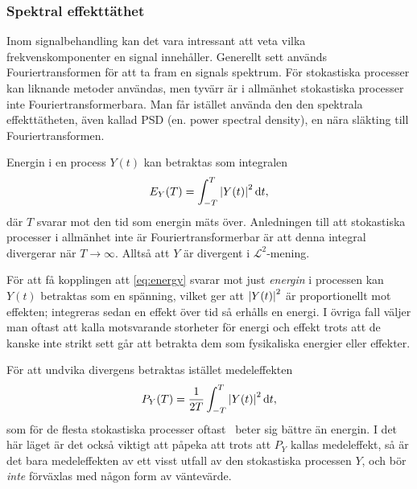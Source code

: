 \subsubsection{Spektral effekttäthet}
Inom signalbehandling kan det vara intressant att veta vilka frekvenskomponenter en signal innehåller. Generellt sett används Fouriertransformen för att ta fram en signals spektrum.
För stokastiska processer kan liknande metoder användas, men tyvärr är i allmänhet stokastiska processer inte Fouriertransformerbara. Man får istället använda den den spektrala effekttätheten, även kallad PSD (en. power spectral density), en nära släkting till Fouriertransformen.

Energin i en process $Y(t)$ kan betraktas som integralen
\begin{equation}\label{eq:energy}
E_Y(T) = \int_{-T}^{T} \abs{Y(t)}^2\,\mathrm{d}{t},
\end{equation}
där $T$ svarar mot den tid som energin mäts över. Anledningen till att stokastiska processer i allmänhet inte är Fouriertransformerbar är att denna integral divergerar när $T\to\infty$. Alltså att $Y$ är divergent i $\mathcal{L}^2$-mening. 

För att få kopplingen att \eqref{eq:energy} svarar mot just \emph{energin} i processen kan $Y(t)$ betraktas som en spänning, vilket ger att $\abs{Y(t)}^2$ är proportionellt mot effekten; integreras sedan en effekt över tid så erhålls en energi. I övriga fall väljer man oftast att kalla motsvarande storheter för energi och effekt trots att de kanske inte strikt sett går att betrakta dem som fysikaliska energier eller effekter. 

För att undvika divergens betraktas istället medeleffekten 
\begin{equation}\label{eq:power}
P_Y(T) = \frac{1}{2T} \int_{-T}^{T} \abs{Y(t)}^2\,\mathrm{d}{t},
\end{equation}
som för de flesta stokastiska processer oftast~\cite{Miller_probability2012} beter sig bättre än energin.
I det här läget är det också viktigt att påpeka att trots att $P_Y$ kallas medeleffekt, så är det bara medeleffekten av ett visst utfall av den stokastiska processen $Y$, och bör \emph{inte} förväxlas med någon form av väntevärde. 

